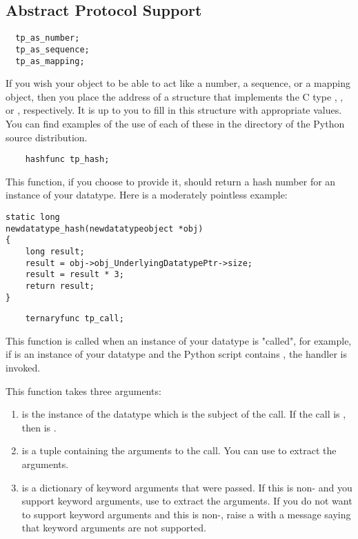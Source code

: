 \subsection{Abstract Protocol Support}

\begin{verbatim}
  tp_as_number;
  tp_as_sequence;
  tp_as_mapping;
\end{verbatim}

If you wish your object to be able to act like a number, a sequence,
or a mapping object, then you place the address of a structure that
implements the C type ,
, or , respectively.
It is up to you to fill in this structure with appropriate values. You
can find examples of the use of each of these in the 
directory of the Python source distribution.


\begin{verbatim}
    hashfunc tp_hash;
\end{verbatim}

This function, if you choose to provide it, should return a hash
number for an instance of your datatype. Here is a moderately
pointless example:

\begin{verbatim}
static long
newdatatype_hash(newdatatypeobject *obj)
{
    long result;
    result = obj->obj_UnderlyingDatatypePtr->size;
    result = result * 3;
    return result;
}
\end{verbatim}

\begin{verbatim}
    ternaryfunc tp_call;
\end{verbatim}

This function is called when an instance of your datatype is "called",
for example, if  is an instance of your datatype and the Python
script contains , the  handler is
invoked.

This function takes three arguments:

\begin{enumerate}
  \item
     is the instance of the datatype which is the subject of
    the call. If the call is , then  is
    .

  \item
     is a tuple containing the arguments to the call.  You
    can use  to extract the arguments.

  \item
     is a dictionary of keyword arguments that were passed.
    If this is non-\NULL{} and you support keyword arguments, use
     to extract the
    arguments.  If you do not want to support keyword arguments and
    this is non-\NULL, raise a  with a message
    saying that keyword arguments are not supported.
\end{enumerate}
       
